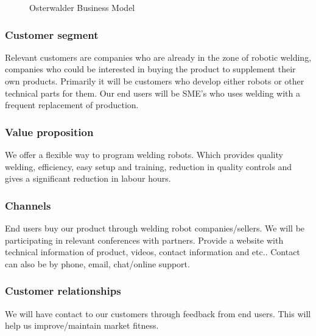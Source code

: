 \begin{figure}
  \caption{Osterwalder Business Model}
  \label{ost_business_model}
\end{figure}

\subsubsection{Customer segment}
Relevant customers are companies who are already in the zone of robotic welding, companies who could be interested in buying the product to supplement their own products. Primarily it will be customers who develop either robots or other technical parts for them.  
Our end users will be SME's who uses welding with a frequent replacement of production.
\subsubsection{Value proposition}
We offer a flexible way to program welding robots. Which provides quality welding, efficiency, easy setup and training, reduction in quality controls and gives a significant reduction in labour hours.
\subsubsection{Channels}
End users buy our product through welding robot companies/sellers. We will be participating in relevant conferences with partners. Provide a website with technical information of product, videos, contact information and etc.. Contact can also be by phone, email, chat/online support.	
\subsubsection{Customer relationships}
We will have contact to our customers through feedback from end users. This will help us improve/maintain market fitness.
